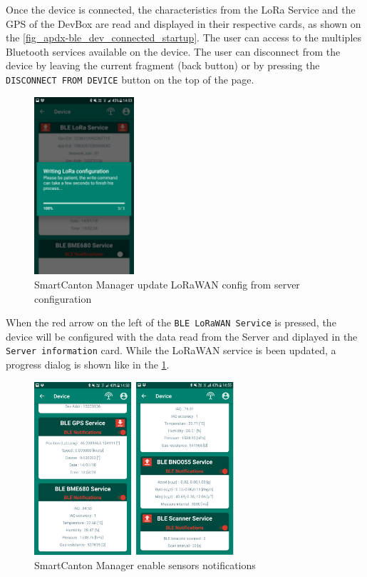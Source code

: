 Once the device is connected, the characteristics from the LoRa Service and the GPS of the DevBox are read and displayed in their respective cards, as shown on the \cref{fig_apdx-ble_dev_connected_startup}. The user can access to the multiples Bluetooth services available on the device. The user can disconnect from the device by leaving the current fragment (back button) or by pressing the \texttt{DISCONNECT FROM DEVICE} button on the top of the page.

\begin{figure}[ht!]
    \centering
    \includegraphics[width=0.33\textwidth]{Figures/Appendixes/Android/ble_dev_writing_lora_new_config.png}
    \caption{SmartCanton Manager update LoRaWAN config from server configuration}
    \label{fig_apdx-ble_dev_writing_lora_new_config}
\end{figure}

When the red arrow on the left of the \texttt{BLE LoRaWAN Service} is pressed, the device will be configured with the data read from the Server and diplayed in the \texttt{Server information} card. While the LoRaWAN service is been updated, a progress dialog is shown like in the \cref{fig_apdx-ble_dev_writing_lora_new_config}.

\begin{figure}[ht!]
    \centering
    \includegraphics[width=0.66\textwidth]{Figures/Appendixes/Android/ble_dev_en_notif.png}
    \caption{SmartCanton Manager enable sensors notifications}
    \label{fig_apdx-ble_dev_en_notif}
\end{figure}


